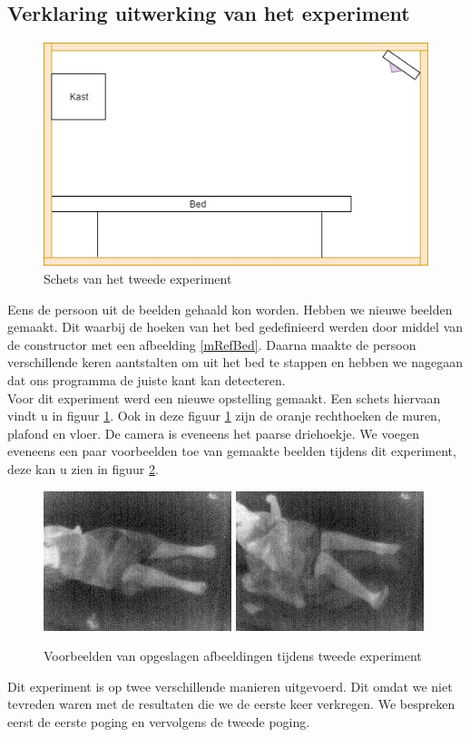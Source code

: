 \subsection{Verklaring uitwerking van het experiment}
\label{ERefDBV}
\begin{figure}[h]
	\includegraphics[scale=0.6]{SchetsExperimentTwee}
	\caption{Schets van het tweede experiment}
	\label{imgTEx}
\end{figure}
Eens de persoon uit de beelden gehaald kon worden. Hebben we nieuwe beelden gemaakt. Dit waarbij de hoeken van het bed gedefinieerd werden door middel van de constructor met een afbeelding \ref{mRefBed}. Daarna maakte de persoon verschillende keren aantstalten om uit het bed te stappen en hebben we nagegaan dat ons programma de juiste kant kan detecteren. \\
Voor dit experiment werd een nieuwe opstelling gemaakt. Een schets hiervaan vindt u in figuur \ref{imgTEx}.
Ook in deze figuur \ref{imgTEx} zijn de oranje rechthoeken de muren, plafond en vloer. De camera is eveneens het paarse driehoekje. We voegen eveneens een paar voorbeelden toe van gemaakte beelden tijdens dit experiment, deze kan u zien in figuur \ref{imgTEx1}.
\begin{figure}[h]
	\includegraphics[scale=0.85]{TweedeExperiment_img0}
	\includegraphics[scale=0.85]{TweedeExperiment_img4}
	\caption{Voorbeelden van opgeslagen afbeeldingen tijdens tweede experiment}
	\label{imgTEx1}
\end{figure}
Dit experiment is op twee verschillende manieren uitgevoerd. Dit omdat we niet tevreden waren met de resultaten die we de eerste keer verkregen. We bespreken eerst de eerste poging en vervolgens de tweede poging. 
